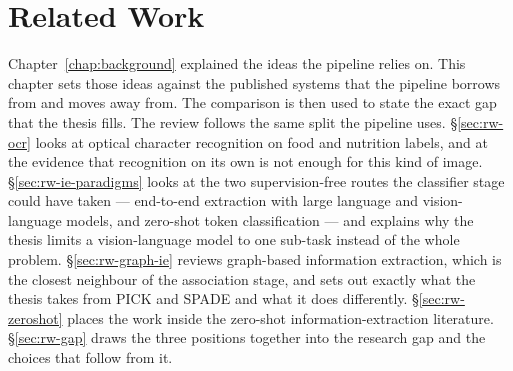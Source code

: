 %
%
%
%
%

\chapter{Related Work}\label{ch:related-work}

Chapter~\ref{chap:background} explained the ideas the pipeline relies on. This chapter sets those ideas against the published systems that the pipeline borrows from and moves away from. The comparison is then used to state the exact gap that the thesis fills. The review follows the same split the pipeline uses. \S\ref{sec:rw-ocr} looks at optical character recognition on food and nutrition labels, and at the evidence that recognition on its own is not enough for this kind of image. \S\ref{sec:rw-ie-paradigms} looks at the two supervision-free routes the classifier stage could have taken --- end-to-end extraction with large language and vision-language models, and zero-shot token classification --- and explains why the thesis limits a vision-language model to one sub-task instead of the whole problem. \S\ref{sec:rw-graph-ie} reviews graph-based information extraction, which is the closest neighbour of the association stage, and sets out exactly what the thesis takes from PICK and SPADE and what it does differently. \S\ref{sec:rw-zeroshot} places the work inside the zero-shot information-extraction literature. \S\ref{sec:rw-gap} draws the three positions together into the research gap and the choices that follow from it.


